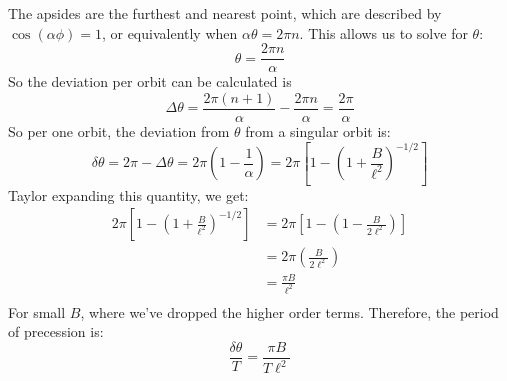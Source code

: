 \documentclass[10pt]{article}
\begin{document}
\begin{enumerate}[label=\alph*)]
					\begin{solution}
							The apsides are the furthest and nearest point, which are described by
							$\cos(\alpha\phi) = 1$, or equivalently when $\alpha \theta = 2\pi n$. This allows 
							us to solve for $\theta$: 
							\[
							\theta = \frac{2\pi n}{\alpha}
							\] 
							So the deviation per orbit can be calculated is 
							\[
							\Delta \theta = \frac{2 \pi (n+1)}{\alpha} - \frac{2\pi n}{\alpha} =
							\frac{2\pi}{\alpha}
							\] 
							So per one orbit, the deviation from $\theta$ from a singular orbit is:
							\[
							\delta \theta = 2\pi - \Delta \theta = 2\pi\left(1 - \frac{1}{\alpha}\right) 
							= 2\pi\left[ 1 - \left( 1 + \frac{B}{\ell^2} \right)^{-1/2}\right] 
							\] 
							Taylor expanding this quantity, we get: 
							\begin{align*}
									2\pi \left[ 1 - \left( 1 + \frac{B}{\ell^2} \right) ^{-1/2}\right] &= 
									2\pi\left[1 - \left( 1-\frac{B}{2\ell^2} \right) \right]\\
									&= 2\pi\left( \frac{B}{2\ell^2} \right)  \\
									&= \frac{\pi B}{\ell^2} \\
							\end{align*}
							For small $B$, where we've dropped the higher order terms. Therefore, the period of
							precession is: 
							\[
									\frac{\delta \theta}{T} = \frac{\pi B}{T\ell^2}
							\] 
					\end{solution}
	\end{enumerate}
\end{document}
